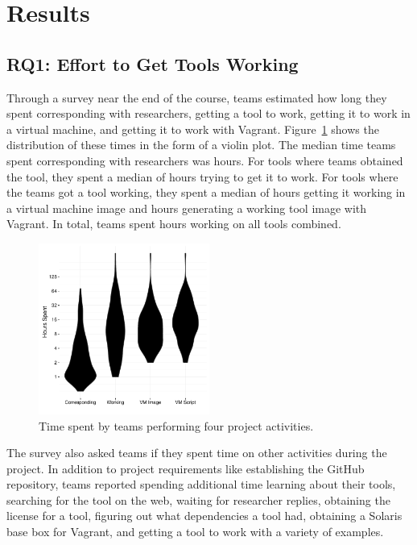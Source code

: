 \documentclass[10pt,conference]{IEEEtran}
\begin{document}
\section{Results}

\subsection{RQ1: Effort to Get Tools Working}

Through a survey near the end of the course, 
teams estimated how long they spent
corresponding with researchers,
getting a tool to work,
getting it to work in a virtual machine,
and getting it to work with Vagrant.
Figure~\ref{fig:duration} shows the distribution of
these times in the form of a violin plot.
The median time teams spent corresponding with
researchers was \durationCorresponding hours.
For tools where teams obtained the tool,
they spent a median of \durationWorking hours
trying to get it to work.
For tools where the teams got a tool working,
they spent a median of \durationVM hours getting it working 
in a virtual machine image and
\durationVagrant hours generating a working tool
image with Vagrant.
In total, teams spent \durationTotal hours working
on all tools combined.

\begin{figure}[!ht]
  \centering
    \includegraphics[width=0.5\textwidth]{durations.pdf}
  \caption{Time spent by teams performing four project activities.}\label{fig:duration}
\end{figure}

The survey also asked teams if they spent
time on other activities during the project.
In addition to project requirements like establishing
the GitHub repository, teams 
reported spending additional time 
learning about their tools,
searching for the tool on the web,
waiting for researcher replies,
obtaining the license for a tool,
figuring out what dependencies a tool had,
obtaining a Solaris base box for Vagrant,
and
getting a tool to work with a variety of examples.
\end{document}
